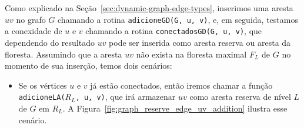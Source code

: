 Como explicado na Seção~\ref{sec:dynamic-graph-edge-types}, inserimos uma aresta $uv$ no grafo $G$ chamando a rotina \texttt{adicioneGD(G, u, v)}, e, em seguida, testamos a conexidade de $u$ e $v$ chamando a rotina \texttt{conectadosGD(G, u, v)}, que dependendo do resultado $uv$ pode ser inserida como aresta reserva ou aresta da floresta. Assumindo que a aresta $uv$ não exista na floresta maximal $F_L$ de $G$ no momento de sua inserção, temos dois cenários:

\begin{itemize}
    \item 
    Se os vértices $u$ e $v$ já estão conectados, então iremos chamar a função \texttt{adicioneLA($R_L$, u, v)}, que irá armazenar $uv$ como aresta reserva de nível $L$ de $G$ em $R_L$. A Figura~\ref{fig:graph_reserve_edge_uv_addition} ilustra esse cenário.

\end{itemize}

